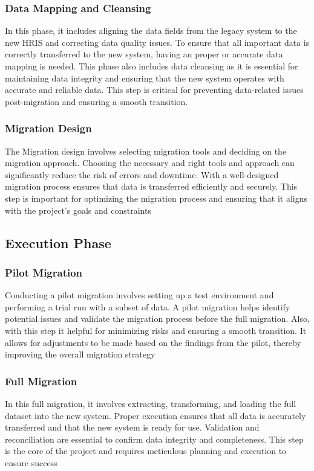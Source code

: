         \subsubsection{Data Mapping and Cleansing}
            In this phase, it includes aligning the data fields from the legacy system to the new HRIS and correcting data quality issues. To ensure that all important data is correctly transferred to the new system, having an proper or accurate data mapping is needed. This phase also includes data cleansing as it is essential for maintaining data integrity and ensuring that the new system operates with accurate and reliable data. This step is critical for preventing data-related issues post-migration and ensuring a smooth transition.

        \subsubsection{Migration Design}
            The Migration design involves selecting migration tools  and deciding on the migration approach. Choosing the necessary and right tools and approach can significantly reduce the risk of errors and downtime. With a well-designed migration process ensures that data is transferred efficiently and securely. This step is important for optimizing the migration process and ensuring that it aligns with the project’s goals and constraints
        
    \subsection{Execution Phase}
        \subsubsection{Pilot Migration}
            Conducting a pilot migration involves setting up a test environment and performing a trial run with a subset of data. A pilot migration helps identify potential issues and validate the migration process before the full migration. Also, with this step it helpful for minimizing risks and ensuring a smooth transition. It allows for adjustments to be made based on the findings from the pilot, thereby improving the overall migration strategy

        \subsubsection{Full Migration}
            In this full migration, it involves extracting, transforming, and loading the full dataset into the new system. Proper execution ensures that all data is accurately transferred and that the new system is ready for use. Validation and reconciliation are essential to confirm data integrity and completeness. This step is the core of the project and requires meticulous planning and execution to ensure success

